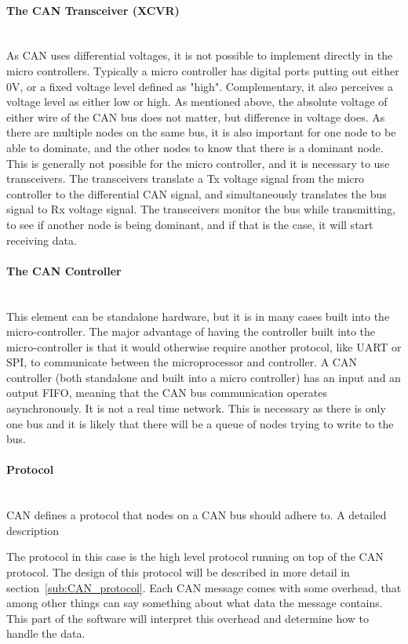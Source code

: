 \paragraph*{The CAN Transceiver (XCVR)}~\\
As CAN uses differential voltages, it is not possible to implement directly in the micro controllers.
Typically a micro controller has digital ports putting out either $ 0 \si{\volt}$, or a fixed voltage level defined as "high".
Complementary, it also perceives a voltage level as either low or high. 
As mentioned above, the absolute voltage of either wire of the CAN bus does not matter, but difference in voltage does. 
As there are multiple nodes on the same bus, it is also important for one node to be able to dominate, and the other nodes to know that there is a dominant node. 
This is generally not possible for the micro controller, and it is necessary to use transceivers.
The transceivers translate a Tx voltage signal from the micro controller to the differential CAN signal, and simultaneously translates the bus signal to Rx voltage signal.
The transceivers monitor the bus while transmitting, to see if another node is being dominant, and if that is the case, it will start receiving data.

\paragraph*{The CAN Controller}~\\
This element can be standalone hardware, but it is in many cases built into the micro-controller.
The major advantage of having the controller built into the micro-controller is that it would otherwise require another protocol, like UART or SPI, to communicate between the microprocessor and controller.
A CAN controller (both standalone and built into a micro controller) has an input and an output FIFO, meaning that the CAN bus communication operates asynchronously. 
It is not a real time network.
This is necessary as there is only one bus and it is likely that there will be a queue of nodes trying to write to the bus.

\paragraph*{Protocol}~\\
CAN defines a protocol that nodes on a CAN bus should adhere to.
A detailed description

The protocol in this case is the high level protocol running on top of the CAN protocol.
The design of this protocol will be described in more detail in section~\ref{sub:CAN_protocol}. 
Each CAN message comes with some overhead, that among other things can say something about what data the message contains.
This part of the software will interpret this overhead and determine how to handle the data.\\

